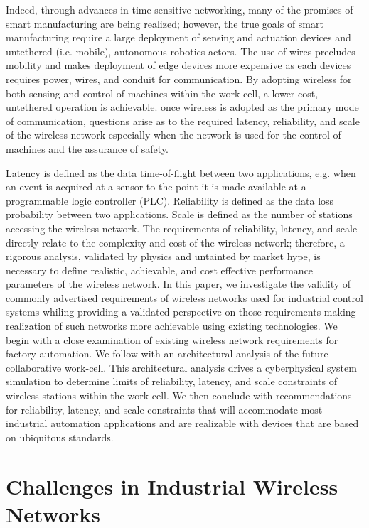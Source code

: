 \documentclass[english]{spimubphdthesis}
\begin{document}
Indeed, through advances in time-sensitive networking, many of the promises of smart manufacturing are being realized; however, the true goals of smart manufacturing require a large deployment of sensing and actuation devices and untethered (i.e. mobile), autonomous robotics actors.  The use of wires precludes mobility and makes deployment of edge devices more expensive as each devices requires power, wires, and conduit for communication. By adopting wireless for both sensing and control of machines within the work-cell, a lower-cost, untethered operation is achievable. once wireless is adopted as the primary mode of communication, questions arise as to the required latency, reliability, and scale of the wireless network especially when the network is used for the control of machines and the assurance of safety. 

Latency is defined as the data time-of-flight between two applications, e.g. when an event is acquired at a sensor to the point it is made available at a programmable logic controller (PLC).  Reliability is defined as the data loss probability between two applications. Scale is defined as the number of stations accessing the wireless network.  The requirements of reliability, latency, and scale directly relate to the complexity and cost of the wireless network; therefore, a rigorous analysis, validated by physics and untainted by market hype, is necessary to define realistic, achievable, and cost effective performance parameters of the wireless network.  In this paper, we investigate the validity of commonly advertised requirements of wireless networks used for industrial control systems whiling providing a validated perspective on those requirements making realization of such networks more achievable using existing technologies.  We begin with a close examination of existing wireless network requirements for factory automation. We follow with an architectural analysis of the future collaborative work-cell. This architectural analysis drives a cyberphysical system simulation to determine limits of reliability, latency, and scale constraints of wireless stations within the work-cell.  We then conclude with recommendations for reliability, latency, and scale constraints that will accommodate most industrial automation applications and are realizable with devices that are based on ubiquitous standards.

\section{Challenges in Industrial Wireless Networks}
\end{document}
